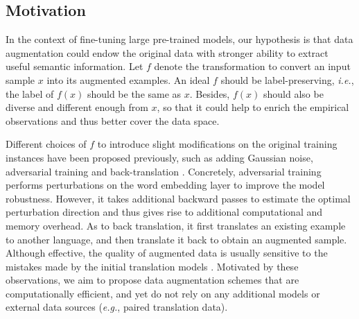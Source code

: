 \documentclass[11pt,a4paper]{article}
\begin{document}
\subsection{Motivation}
In the context of fine-tuning large pre-trained models, our hypothesis is that data augmentation could endow the original data with stronger ability to extract useful semantic information. Let $f$ denote the transformation to convert an input sample $x$ into its augmented examples. An ideal $f$ should be label-preserving, \emph{i.e.}, the label of $f(x)$ should be the same as $x$. Besides, $f(x)$ should also be diverse and different enough from $x$, so that it could help to enrich the empirical observations and thus better cover the data space. 

Different choices of $f$ to introduce slight modifications on the original training instances have been proposed previously, such as adding Gaussian noise, adversarial training \cite{liu2020adversarial, zhu2019freelb} and back-translation \cite{wei2018fast, xie2019unsupervised}. Concretely, adversarial training performs perturbations on the word embedding layer to improve the model robustness. 
However, it takes additional backward passes to estimate the optimal perturbation direction and thus gives rise to additional computational and memory overhead.
As to back translation, it first translates an existing example to another language, and then translate it back to obtain an augmented sample. 
Although effective, the quality of augmented data is usually sensitive to the mistakes made by the initial translation models \cite{chapelle2009semi, Wang2018SwitchOutAE}. Motivated by these observations, we aim to propose data augmentation schemes that are computationally efficient, and yet do not rely on any additional models or external data sources (\emph{e.g.}, paired translation data). 
\end{document}
